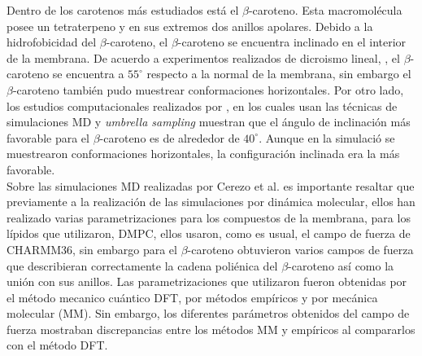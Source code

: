  Dentro de los carotenos m\'{a}s estudiados est\'{a} el $\beta$-caroteno. Esta macromol\'{e}cula posee un tetraterpeno y en sus extremos dos anillos apolares. Debido a la hidrofobicidad del $\beta$-caroteno, el $\beta$-caroteno se encuentra inclinado en el interior de la membrana. De acuerdo a experimentos realizados de dicroismo lineal, \cite{Gruszecki2004CarotenoidsProperties}, el $\beta$-caroteno se encuentra a $55^{\circ}$ respecto a la normal de la membrana, sin embargo el $\beta$-caroteno tambi\'{e}n pudo muestrear conformaciones horizontales. Por otro lado, los estudios computacionales realizados por \cite{Cerezo2013ConformationalSimulations}, en los cuales usan las t\'{e}cnicas de simulaciones MD y \textit{umbrella sampling}  muestran que el \'{a}ngulo de inclinaci\'{o}n m\'{a}s favorable para el $\beta$-caroteno es de alrededor de $40^{\circ}$. Aunque en la simulaci\'{o} se muestrearon conformaciones horizontales, la configuraci\'{o}n inclinada era la m\'{a}s favorable.\\
 
 Sobre las simulaciones MD realizadas por Cerezo et al. \cite{Cerezo2013ConformationalSimulations} es importante resaltar que previamente a la realizaci\'{o}n de las simulaciones por din\'{a}mica molecular, ellos han realizado varias parametrizaciones para los compuestos de la membrana, para los l\'{i}pidos que utilizaron, DMPC, ellos usaron, como es usual, el campo de fuerza de CHARMM36, sin embargo para el $\beta$-caroteno obtuvieron varios campos de fuerza que describieran correctamente la cadena poli\'{e}nica del $\beta$-caroteno as\'{i} como la uni\'{o}n con sus anillos. Las parametrizaciones que utilizaron fueron obtenidas por el m\'{e}todo mecanico cu\'{a}ntico DFT, por m\'{e}todos emp\'{i}ricos y por mec\'{a}nica molecular (MM). Sin embargo, los diferentes par\'{a}metros obtenidos del campo de fuerza mostraban discrepancias entre los m\'{e}todos MM y emp\'{i}ricos al compararlos con el m\'{e}todo DFT.\\
 
